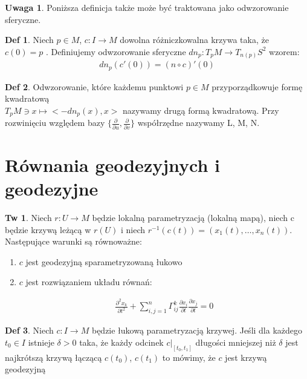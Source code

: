 \documentclass{article}
\theoremstyle{plain}
\theoremstyle{definition}
\newtheorem*{defi*}{Def}
\newtheorem*{tw*}{Tw}
\theoremstyle{definition}
\newtheorem*{not*}{Uwaga}
\begin{document}
\begin{not*}
Poniższa definicja także może być traktowana jako odwzorowanie sferyczne.
\end{not*}

\begin{defi*}
Niech $p \in M$, $c: I \to M$ dowolna różniczkowalna krzywa taka, że $c(0) = p$ . Definiujemy odwzorowanie sferyczne $ dn_p: T_pM \to T_{n(p)}S^2$ wzorem: 
\begin{align*}
    dn_p(c'(0)) = (n \circ c)'(0)
\end{align*}

\end{defi*}

\begin{defi*}
Odwzorowanie, które każdemu punktowi $p \in M$ przyporządkowuje formę kwadratową \\ ${T_pM \ni x \mapsto <-dn_p(x), x > }$ nazywamy drugą formą kwadratową. Przy rozwinięciu względem bazy $\{ \frac{\partial}{\partial u}, \frac{\partial}{\partial v} \}$ współrzędne nazywamy L, M, N.
\end{defi*}

\section{Równania geodezyjnych i geodezyjne}

\begin{tw*}
Niech $r: U \to M$ będzie lokalną parametryzacją (lokalną mapą), niech c będzie krzywą leżącą w $r(U)$ i niech ${r^{-1}(c(t)) = (x_1(t), \ldots ,x_n(t))}$. Następujące warunki są równoważne:
\begin{enumerate}
    \item $c$ jest geodezyjną sparametryzowaną łukowo
    \item $c$ jest rozwiązaniem układu równań:
    
    \begin{align*}
        \frac{\partial^2x_k}{\partial t^2} + \sum_{i,j=1}^n \Gamma_{ij}^k \frac{\partial x_i}{\partial t}  \frac{\partial x_j}{\partial t} = 0
        \end{align*}
\end{enumerate}

\end{tw*}

\begin{defi*}
Niech $c: I \to M$ będzie łukową parametryzacją krzywej. Jeśli dla każdego $t_0 \in I$ istnieje $\delta > 0$ taka, że każdy odcinek $c|_[t_0, t_1]$ długości mniejszej niż $\delta$ jest najkrótszą krzywą łączącą $c(t_0)$, $c(t_1)$ to mówimy, że $c$ jest krzywą geodezyjną
\end{defi*}
\end{document}
